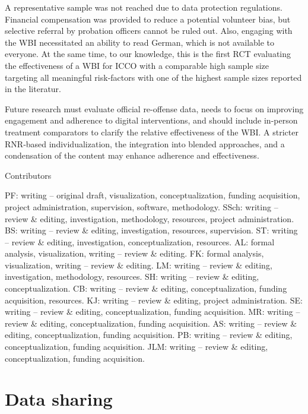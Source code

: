 \documentclass[
  super,
  preprint,
  1p,
  onecolumn]{elsarticle}
\begin{document}
A representative sample was not reached due to data protection
regulations. Financial compensation was provided to reduce a potential
volunteer bias, but selective referral by probation officers cannot be
ruled out. Also, engaging with the WBI necessitated an ability to read
German, which is not available to everyone. At the same time, to our
knowledge, this is the first RCT evaluating the effectiveness of a WBI
for ICCO with a comparable high sample size targeting all meaningful
risk-factors with one of the highest sample sizes reported in the
literatur.

Future research must evaluate official re-offense data, needs to focus
on improving engagement and adherence to digital interventions, and
should include in-person treatment comparators to clarify the relative
effectiveness of the WBI. A stricter RNR‑based individualization, the
integration into blended approaches, and a condensation of the content
may enhance adherence and effectiveness.

\newpage{}

{Contributors}

PF: writing -- original draft, visualization, conceptualization, funding
acquisition, project administration, supervision, software, methodology.
SSch: writing -- review \& editing, investigation, methodology,
resources, project administration. BS: writing -- review \& editing,
investigation, resources, supervision. ST: writing -- review \& editing,
investigation, conceptualization, resources. AL: formal analysis,
visualization, writing -- review \& editing. FK: formal analysis,
visualization, writing -- review \& editing. LM: writing -- review \&
editing, investigation, methodology, resources. SH: writing -- review \&
editing, conceptualization. CB: writing -- review \& editing,
conceptualization, funding acquisition, resources. KJ: writing -- review
\& editing, project administration. SE: writing -- review \& editing,
conceptualization, funding acquisition. MR: writing -- review \&
editing, conceptualization, funding acquisition. AS: writing -- review
\& editing, conceptualization, funding acquisition. PB: writing --
review \& editing, conceptualization, funding acquisition. JLM: writing
-- review \& editing, conceptualization, funding acquisition.

\section*{Data sharing}\label{data-sharing}
\end{document}
